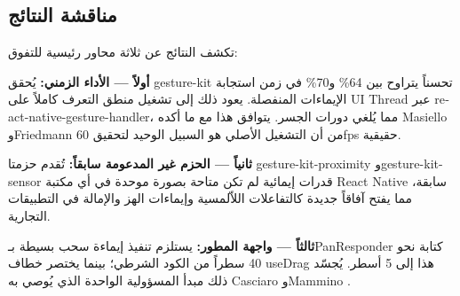 \begin{Arabic}
\subsection{مناقشة النتائج}

تكشف النتائج عن ثلاثة محاور رئيسية للتفوق:

\textbf{أولاً --- الأداء الزمني:} يُحقق \textenglish{gesture-kit} تحسناً يتراوح بين 64\% و70\% في زمن استجابة الإيماءات المنفصلة. يعود ذلك إلى تشغيل منطق التعرف كاملاً على \textenglish{UI Thread} عبر \textenglish{react-native-gesture-handler}، مما يُلغي دورات الجسر. يتوافق هذا مع ما أكده \textenglish{Masiello} و\textenglish{Friedmann} \cite{masiello2017} من أن التشغيل الأصلي هو السبيل الوحيد لتحقيق 60fps حقيقية.

\textbf{ثانياً --- الحزم غير المدعومة سابقاً:} تُقدم حزمتا \textenglish{gesture-kit-proximity} و\textenglish{gesture-kit-sensor} قدرات إيمائية لم تكن متاحة بصورة موحدة في أي مكتبة \textenglish{React Native} سابقة، مما يفتح آفاقاً جديدة كالتفاعلات اللاّلمسية وإيماءات الهز والإمالة في التطبيقات التجارية.

\textbf{ثالثاً --- واجهة المطور:} يستلزم تنفيذ إيماءة سحب بسيطة بـ\textenglish{PanResponder} كتابة نحو 40 سطراً من الكود الشرطي؛ بينما يختصر خطاف \textenglish{useDrag} هذا إلى 5 أسطر. يُجسّد ذلك مبدأ المسؤولية الواحدة الذي يُوصي به \textenglish{Casciaro} و\textenglish{Mammino} \cite{casciaro2020}.

\end{Arabic}
